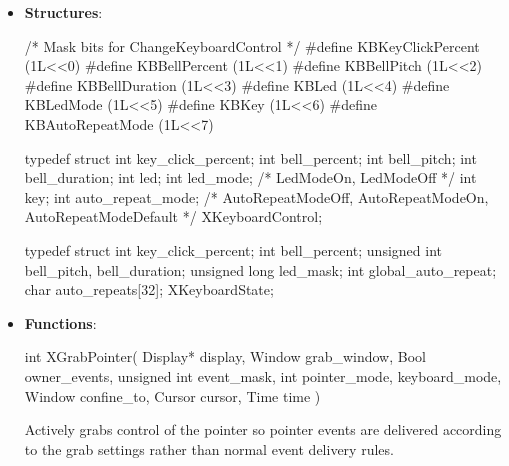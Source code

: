\documentclass{report}
\begin{document}
    \pagebreak 
    \begin{itemize}
        \item \textbf{Structures}:
            \begin{cppcode}
            /* Mask bits for ChangeKeyboardControl */
            #define KBKeyClickPercent (1L<<0)
            #define KBBellPercent (1L<<1)
            #define KBBellPitch (1L<<2)
            #define KBBellDuration (1L<<3)
            #define KBLed (1L<<4)
            #define KBLedMode (1L<<5)
            #define KBKey (1L<<6)
            #define KBAutoRepeatMode (1L<<7)

            typedef struct {
                int key_click_percent;
                int bell_percent;
                int bell_pitch;
                int bell_duration;
                int led;
                int led_mode;           /* LedModeOn, LedModeOff */
                int key;
                int auto_repeat_mode;   /* AutoRepeatModeOff, AutoRepeatModeOn, AutoRepeatModeDefault */
            } XKeyboardControl;
            \end{cppcode}
            \begin{cppcode}
                typedef struct {
                    int key_click_percent;
                    int bell_percent;
                    unsigned int bell_pitch, bell_duration;
                    unsigned long led_mask;
                    int global_auto_repeat;
                    char auto_repeats[32];
                } XKeyboardState;  
            \end{cppcode}
    \item \textbf{Functions}:
        \begin{cppcode}
        int XGrabPointer(
            Display* display,
            Window grab_window,
            Bool owner_events,
            unsigned int event_mask,
            int pointer_mode, keyboard_mode,
            Window confine_to,
            Cursor cursor,
            Time time
        )
        \end{cppcode}
        \bigbreak \noindent
        Actively grabs control of the pointer so pointer events are delivered according to the grab settings rather than normal event delivery rules.


\end{itemize}
\end{document}
